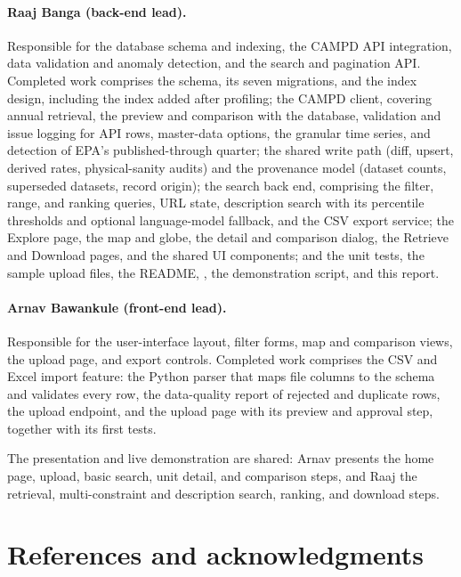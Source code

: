 \documentclass[11pt,a4paper]{article}
\begin{document}
\paragraph{Raaj Banga (back-end lead).} Responsible for the database schema and indexing, the
CAMPD API integration, data validation and anomaly detection, and the search and pagination
API. Completed work comprises the schema, its seven migrations, and the index design,
including the  index added after profiling; the CAMPD client, covering
annual retrieval, the preview and comparison with the database, validation and issue logging
for API rows, master-data options, the granular time series, and detection of EPA's
published-through quarter; the shared write path (diff, upsert, derived rates, physical-sanity
audits) and the provenance model (dataset counts, superseded datasets, record origin); the
search back end, comprising the filter, range, and ranking queries, URL state, description
search with its percentile thresholds and optional language-model fallback, and the CSV export
service; the Explore page, the map and globe, the detail and comparison dialog, the Retrieve and
Download pages, and the shared UI components; and the unit tests, the sample upload files,
the README, , the demonstration script, and this report.

\paragraph{Arnav Bawankule (front-end lead).} Responsible for the user-interface layout, filter
forms, map and comparison views, the upload page, and export controls. Completed work comprises the
CSV and Excel import feature: the Python parser that maps file columns to the schema and
validates every row, the data-quality report of rejected and duplicate rows, the upload
endpoint, and the upload page with its preview and approval step, together with its first
tests.

The presentation and live demonstration are shared: Arnav presents the home page, upload,
basic search, unit detail, and comparison steps, and Raaj the retrieval, multi-constraint and
description search, ranking, and download steps.

\section{References and acknowledgments}
\label{sec:references}
\end{document}
